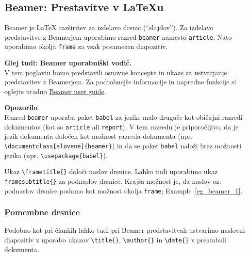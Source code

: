 \subsection{Beamer: Prestavitve v LaTeXu}


Beamer je LaTeX razširitev za izdelavo drsnic (``slajdov'').
Za izdelavo predstavitve z Beamerjem uporabimo razred \texttt{beamer} namesto \texttt{article}.
Nato uporabimo okolja \texttt{frame} za vsak posamezen diapozitiv.

\begin{framed}
\textbf{Glej tudi: Beamer uporabniški vodič.}\\
V tem poglaviu bomo predstavili osnovne koncepte in ukaze za ustvarjanje predstavitev z Beamerjem.
Za podrobnejše informacije in napredne funkcije si oglejte uradno \href{https://tug.ctan.org/macros/latex/contrib/beamer/doc/beameruserguide.pdf}{Beamer user guide}.
\end{framed}

\begin{framed}
\textbf{Opozorilo}\\
Razred \texttt{beamer} uporaba paket \texttt{babel} za jezike malo drugače kot običajni razredi dokumentov (kot so \texttt{article} ali \texttt{report}).
V tem razredu je priporočljivo, da je jezik dokumenta določen kot možnost razreda dokumenta (npr. \texttt{{\textbackslash}documentclass[slovene]\{beamer\}}) in da se paket \texttt{babel} naloži brez možnosti jezika (npr. \texttt{{\textbackslash}usepackage\{babel\}}).
\end{framed}

Ukaz \texttt{{\textbackslash}frametitle\{\}} določi naslov drsnice. Lahko tudi uporabimo ukaz \texttt{framesubtitle\{\}} za podnaslov drsnice.
Krajša možnost je, da naslov oz. podnaslov drsnice podamo kot možnost okolja \texttt{frame}; Example~\ref{eg_beamer_1}.

\begin{example}\label{eg_beamer_1}\end{example}\subsubsection{Pomembne drsnice}

Podobno kot pri člankih lahko tudi pri Beamer predstavitvah ustvarimo naslovni diapozitiv z uporabo ukazov \texttt{{\textbackslash}title\{\}}, \texttt{{\textbackslash}author\{\}} in \texttt{{\textbackslash}date\{\}} v preambuli dokumenta.

